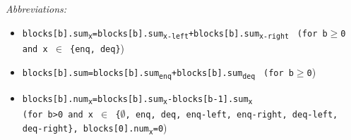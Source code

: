 \documentclass[10pt]{article}
\newcommand{\sub}[1]{\textsubscript{#1}}
\renewcommand{\tt}[1]{\texttt{#1}}
\renewcommand{\it}[1]{\textit{#1}}
\theoremstyle{definition}
\begin{document}

\begin{footnotesize}
  

\it{Abbreviations:}
\begin{itemize}
 \item \tt{blocks[b].sum\sub{x}=blocks[b].sum\sub{x-left}+blocks[b].sum\sub{x-right}}  \tt{ (for b$\geq$0 and x $\in$ \{enq, deq\}})
 \item \tt{blocks[b].sum=blocks[b].sum\sub{enq}+blocks[b].sum\sub{deq}}  \tt{ (for b$\geq$0})
  \item \tt{blocks[b].num\sub{x}=blocks[b].sum\sub{x}-blocks[b-1].sum\sub{x}} \\ \tt{(for b>0 and x $\in$ \{$\emptyset$, enq, deq, enq-left, enq-right, deq-left, deq-right\}, blocks[0].num\sub{x}=0})
\end{itemize}
\end{footnotesize}



\end{document}
